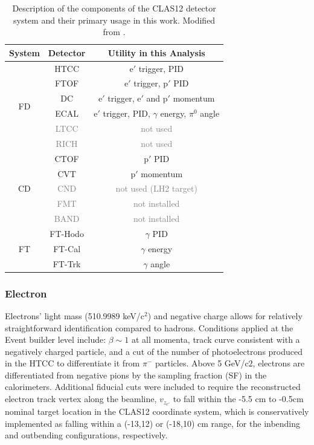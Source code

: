     \begin{table}[htb]
        \centering
        \begin{tabular}{c|c|c}
            System & Detector  & Utility in this Analysis \\
            \hline
            \multirow{6}{*}{FD} & HTCC & $\mathrm{e'}$ trigger, PID \\
            & FTOF & $\mathrm{e'}$ trigger, $\mathrm{p'}$ PID \\
            & DC & $\mathrm{e'}$ trigger, $\mathrm{e'}$ and $\mathrm{p'}$ momentum \\
            & ECAL & $\mathrm{e'}$ trigger, PID, $\gamma$ energy, $\pi^0$ angle \\
            & \textcolor{gray}{LTCC} & \textcolor{gray}{not used} \\
            & \textcolor{gray}{RICH} & \textcolor{gray}{not used} \\
            \hline
            \multirow{5}{*}{CD} & CTOF & $\mathrm{p'}$ PID \\
            & CVT & $\mathrm{p'}$ momentum \\
            & \textcolor{gray}{CND} & \textcolor{gray}{not used (LH2 target)} \\
            & \textcolor{gray}{FMT} & \textcolor{gray}{not installed} \\
            & \textcolor{gray}{BAND} & \textcolor{gray}{not installed} \\
            \hline
            \multirow{3}{*}{FT} & FT-Hodo & $\gamma$ PID \\
            & FT-Cal & $\gamma$ energy \\
            & FT-Trk & $\gamma$ angle \\
        \end{tabular}
        \caption[CLAS12 Detectors Main Functions]{Description of the components of the CLAS12 detector system and their primary usage in this work. Modified from \parencite{Lee2022MeasurementDetector}.}
        \label{tab:detector_components}
    \end{table}

    \subsubsection*{Electron}
        Electrons' light mass (510.9989 keV/c$^2$) and negative charge allows for relatively straightforward identification compared to hadrons. Conditions applied at the Event builder level include: $\beta \sim 1$ at all momenta, track curve consistent with a negatively charged particle, and a cut of the number of photoelectrons produced in the HTCC to differentiate it from $\pi^-$ particles. Above 5 GeV/c$2$, electrons are differentiated from negative pions by the sampling fraction (SF) in the calorimeters. Additional fiducial cuts were included to require the reconstructed electron track vertex along the beamline, $v_{z_{e'}}$ to fall within the -5.5 cm to -0.5cm nominal target location in the CLAS12 coordinate system, which is conservatively implemented as falling within a (-13,12) or (-18,10) cm range, for the inbending and outbending configurations, respectively. 
        
